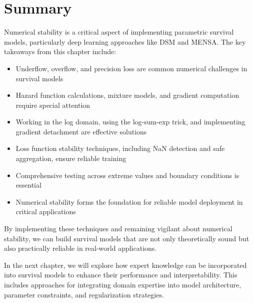 \section{Summary}

Numerical stability is a critical aspect of implementing parametric survival models, particularly deep learning approaches like DSM and MENSA. The key takeaways from this chapter include:

\begin{itemize}
    \item Underflow, overflow, and precision loss are common numerical challenges in survival models
    \item Hazard function calculations, mixture models, and gradient computation require special attention
    \item Working in the log domain, using the log-sum-exp trick, and implementing gradient detachment are effective solutions
    \item Loss function stability techniques, including NaN detection and safe aggregation, ensure reliable training
    \item Comprehensive testing across extreme values and boundary conditions is essential
    \item Numerical stability forms the foundation for reliable model deployment in critical applications
\end{itemize}

By implementing these techniques and remaining vigilant about numerical stability, we can build survival models that are not only theoretically sound but also practically reliable in real-world applications.

\begin{notebox}[title=Looking Ahead]
In the next chapter, we will explore how expert knowledge can be incorporated into survival models to enhance their performance and interpretability. This includes approaches for integrating domain expertise into model architecture, parameter constraints, and regularization strategies.
\end{notebox}